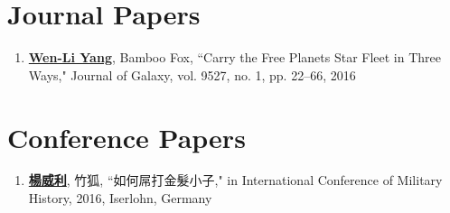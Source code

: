 \begin{publications}


\section*{Journal Papers}
\begin{spacing}{1}
\begin{enumerate}

\item {\bf \underline{Wen-Li Yang}}, Bamboo Fox, ``Carry the Free Planets Star Fleet in Three Ways," Journal of Galaxy, vol. 9527, no. 1, pp. 22--66, 2016

\end{enumerate}
\end{spacing}


\section*{Conference Papers}
\begin{spacing}{1}
\begin{enumerate}

\item {\bf \underline{楊威利}}, 竹狐, ``如何屌打金髮小子," in International Conference of Military History, 2016, Iserlohn, Germany

\end{enumerate}
\end{spacing}


\end{publications}
